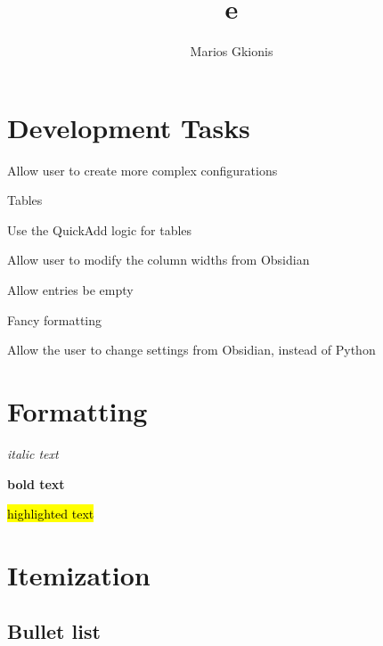 \documentclass{article}
\begin{document}
\date{}
\author{Marios Gkionis}
\title{e}
\maketitle

\tableofcontents 
 \newpage

\section{Development Tasks}


\begin{todolist}
\item Allow user to create more complex configurations
\item Tables
\begin{todolist}
\item Use the QuickAdd logic for tables
\item Allow user to modify the column widths from Obsidian
\item Allow entries be empty
\item Fancy formatting
\end{todolist}
\item Allow the user to change settings from Obsidian, instead of Python
\end{todolist}


\section{Formatting}




\textit{italic text}

\textbf{bold text}

\hl{highlighted text}





\section{Itemization}

\subsection{Bullet list}
\end{document}
